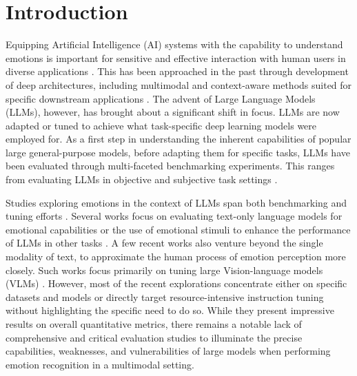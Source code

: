 \section{Introduction}
\label{sec:introduction}

Equipping Artificial Intelligence (AI) systems with the capability to understand emotions is important for sensitive and effective interaction with human users in diverse applications \cite{kolakowska2014emotion, zhao2018predicting, yang2021stimuli, wang2023unlocking}. This has been approached in the past through development of deep architectures, including multimodal and context-aware methods suited for specific downstream applications \cite{lee2019context, mittal2020emoticon, hoang2021context}. The advent of Large Language Models (LLMs), however, has brought about a significant shift in focus. LLMs are now adapted or tuned to achieve what task-specific deep learning models were employed for. As a first step in understanding the inherent capabilities of popular large general-purpose models, before adapting them for specific tasks, LLMs have been evaluated through multi-faceted benchmarking experiments. This ranges from evaluating LLMs in objective \cite{hendrycks2021measuring, lu2022learn} and subjective task settings \cite{ziems2022moral, khandelwal2024moral, fung2024massively}. 

Studies exploring emotions in the context of LLMs span both benchmarking and tuning efforts \cite{xie2024emovit, xenos2024vllms, etesam2024contextual}. Several works focus on evaluating text-only language models for emotional capabilities \cite{liu2024emollms, wang2023emotional} or the use of emotional stimuli to enhance the performance of LLMs in other tasks \cite{li2023large, li2024good}. A few recent works also venture beyond the single modality of text, to approximate the human process of emotion perception more closely. Such works focus primarily on tuning large Vision-language models (VLMs) \cite{xie2024emovit, xenos2024vllms, etesam2024contextual}. However, most of the recent explorations concentrate either on specific datasets and models or directly target resource-intensive instruction tuning without highlighting the specific need to do so. While they present impressive results on overall quantitative metrics, there remains a notable lack of comprehensive and critical evaluation studies to illuminate the precise capabilities, weaknesses, and vulnerabilities of large models when performing emotion recognition in a multimodal setting. 

